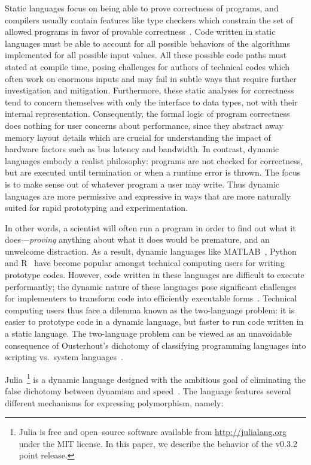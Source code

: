\documentclass[pldi]{sigplanconf-pldi15}
\begin{document}
Static languages focus on being able to prove correctness of programs, and
compilers usually contain features like type checkers which constrain the set
of allowed programs in favor of provable correctness~\cite{Pierce2002}. Code written in static
languages must be able to account for all possible behaviors of the algorithms
implemented for all possible input values. All these possible code paths must
stated at compile time, posing challenges for authors of technical codes which
often work on enormous inputs and may fail in subtle ways that require further
investigation and mitigation. Furthermore, these static analyses for
correctness tend to concern themselves with only the interface to data types,
not with their internal representation. Consequently, the formal logic of
program correctness does nothing for user concerns about performance, since
they abstract away memory layout details which are crucial for understanding the
impact of hardware factors such as bus latency and bandwidth. In contrast,
dynamic languages embody a realist philosophy: programs are not checked for
correctness, but are executed until termination or when a runtime error is
thrown. The focus is to make sense out of whatever program a user may write.
Thus dynamic languages are more permissive and expressive in ways that are more
naturally suited for rapid prototyping and experimentation.

In other words, a scientist will often run a program in order to find out what
it does---\emph{proving} anything about what it does would be premature, and an
unwelcome distraction. As a result, dynamic languages like
MATLAB~\cite{matlab}, Python~\cite{pythonlib,pythonref} and R~\cite{rlang} have
become popular amongst technical computing users for writing prototype codes.
However, code written in these languages are difficult to execute performantly;
the dynamic nature of these languages pose significant challenges for
implementers to transform code into efficiently executable
forms~\cite{Joisha2001,Joisha2006,Seljebotn2009}. Technical computing users
thus face a dilemma known as the two-language problem: it is easier to
prototype code in a dynamic language, but faster to run code written in a
static language. The two-language problem can be viewed as an unavoidable
consequence of Ousterhout's dichotomy of classifying programming languages into
scripting vs.\ system languages~\cite{Ousterhout1998,Hoare2014}. 

Julia~\footnote{Julia is free and open--source software available from
\url{http://julialang.org} under the MIT license. In this paper, we describe
the behavior of the v0.3.2 point release.} is a dynamic language designed with
the ambitious goal of eliminating the false dichotomy between dynamism and
speed~\cite{Bezanson2012,Bezanson2014b}. The language features several
different mechanisms for expressing polymorphism, namely:
\end{document}

